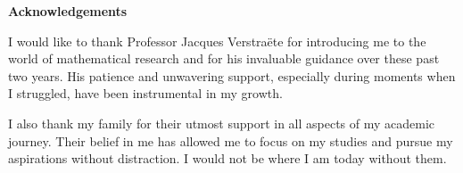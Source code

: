 \begin{center}
  \textbf{\Large Acknowledgements}
\end{center}

\vspace{0.5cm}

I would like to thank Professor Jacques Verstraëte for introducing me to the world of mathematical research and for his invaluable guidance over these past two years. His patience and unwavering support, especially during moments when I struggled, have been instrumental in my growth.

I also thank my family for their utmost support in all aspects of my academic journey. Their belief in me has allowed me to focus on my studies and pursue my aspirations without distraction. I would not be where I am today without them.